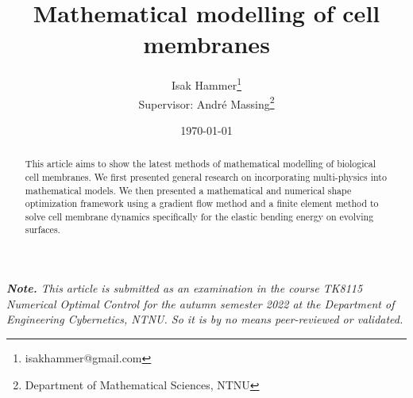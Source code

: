 \documentclass[10pt,conference]{IEEEtran}
\title{ {\Large \textbf{Mathematical modelling of cell membranes }} }
\author{Isak Hammer\footnote{isakhammer@gmail.com} \\{\small Supervisor: André Massing\footnote{Department of Mathematical Sciences, NTNU}} }
\date{\today}
\begin{document}
\maketitle
\begin{sloppy}
\textit{ \textbf{Note.} This article is submitted as an examination in the course TK8115 Numerical Optimal Control for the autumn semester 2022 at the Department of Engineering Cybernetics, NTNU. So it is by no means peer-reviewed or validated.}


\begin{abstract}
This article aims to show the latest methods of mathematical modelling of biological cell membranes. We first presented general research on incorporating multi-physics into mathematical models. We then presented a mathematical and numerical shape optimization framework using a gradient flow method and a finite element method to solve cell membrane dynamics specifically for the elastic bending energy on evolving surfaces.
\end{abstract}

    
    
    
    
    

    \printbibliography
\end{sloppy}
\end{document}
